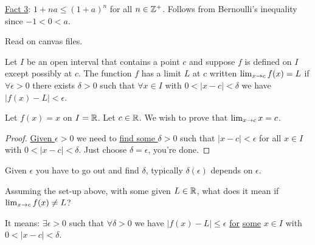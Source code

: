 \documentclass[]{article}
\begin{document}
\begin{example}
	[Exam \#7] \ul{Fact 3}: $1+na \leq (1+a)^n$ for all $n\in\mathbb{Z}^+$. Follows from Bernoulli's inequality since $-1<0<a$.
\end{example}

Read  on canvas files.

\begin{definition}
	Let $I$ be an open interval that contains a point $c$ and suppose $f$ is defined on $I$ except possibly at $c$.
	The function $f$ has a limit $L$ at $c$ written $\lim_{x\rightarrow c} f(x) = L$ if $\forall \epsilon>0$ there exists $\delta>0$ such that $\forall x\in I$ with $0<|x-c|<\delta$ we have $| f(x) - L|< \epsilon$.
\end{definition}
\begin{example}
	Let $f(x) = x$ on $I=\mathbb{R}$. Let $c\in\mathbb{R}$. We wish to prove that $\lim_{x\rightarrow c} x = c$.
\end{example}
\begin{proof}
	\ul{Given $\epsilon>0$} we need to \ul{find some $\delta>0$} such that $|x-c|<\epsilon$ for all $x\in I$ with $0<|x-c|<\delta$.
	Just choose $\delta = \epsilon$, you're done.
\end{proof}
\begin{remark}
	Given $\epsilon$ you have to go out and find $\delta$, typically $\delta(\epsilon)$ depends on $\epsilon$.
\end{remark}
\begin{question}
	Assuming the set-up above, with some given $L\in \mathbb{R}$, what does it mean if \ul{$\lim_{x\rightarrow c} f(x) \neq L$}?
\end{question}
It means: \ul{$\exists\epsilon>0$} such that $\forall \delta>0$ we have $|f(x)-L|\leq \epsilon$ \ul{for} \ul{some} $x\in I$ with \ul{$0<|x-c|<\delta$}.
\end{document}
